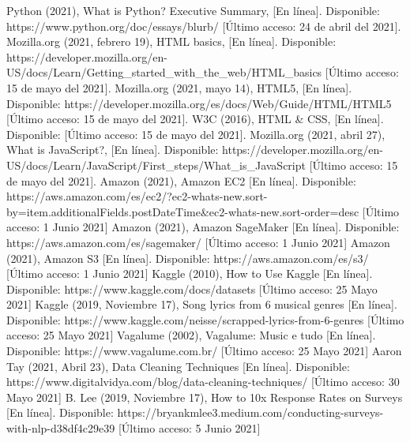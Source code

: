 \documentclass[12pt, a4paper, titlepage]{article}
\begin{document}
	\begin{thebibliography}{20}
		Python (2021), What is Python? Executive Summary, [En línea]. Disponible: https://www.python.org/doc/essays/blurb/ [Último acceso: 24 de abril del 2021].
		Mozilla.org (2021, febrero 19), HTML basics, [En línea]. Disponible: https://developer.mozilla.org/en-US/docs/Learn/Getting\_started\_with\_the\_web/HTML\_basics [Último acceso: 15 de mayo del 2021].
		Mozilla.org (2021, mayo 14), HTML5, [En línea]. Disponible: https://developer.mozilla.org/es/docs/Web/Guide/HTML/HTML5 [Último acceso: 15 de mayo del 2021].
		W3C (2016), HTML \& CSS, [En línea]. Disponible: [Último acceso: 15 de mayo del 2021].		
		Mozilla.org (2021, abril 27), What is JavaScript?, [En línea]. Disponible: https://developer.mozilla.org/en-US/docs/Learn/JavaScript/First\_steps/What\_is\_JavaScript [Último acceso: 15 de mayo del 2021].
		Amazon (2021), Amazon EC2 [En línea]. Disponible: https://aws.amazon.com/es/ec2/?ec2-whats-new.sort-by=item.additionalFields.postDateTime\&ec2-whats-new.sort-order=desc [Último acceso: 1 Junio 2021]		
		Amazon (2021), Amazon SageMaker [En línea]. Disponible: https://aws.amazon.com/es/sagemaker/ [Último acceso: 1 Junio 2021]		
		Amazon (2021), Amazon S3 [En línea]. Disponible: https://aws.amazon.com/es/s3/ [Último acceso: 1 Junio 2021]		
		Kaggle (2010), How to Use Kaggle [En línea]. Disponible: https://www.kaggle.com/docs/datasets [Último acceso: 25 Mayo 2021]
		Kaggle (2019, Noviembre 17), Song lyrics from 6 musical genres [En línea]. Disponible: https://www.kaggle.com/neisse/scrapped-lyrics-from-6-genres [Último acceso: 25 Mayo 2021]
		Vagalume (2002), Vagalume: Music e tudo [En línea]. Disponible: https://www.vagalume.com.br/ [Último acceso: 25 Mayo 2021]		
		Aaron Tay (2021, Abril 23), Data Cleaning Techniques [En línea]. Disponible: https://www.digitalvidya.com/blog/data-cleaning-techniques/ [Último acceso: 30 Mayo 2021]
		B. Lee (2019, Noviembre 17), How to 10x Response Rates on Surveys [En línea]. Disponible: https://bryankmlee3.medium.com/conducting-surveys-with-nlp-d38df4c29e39 [Último acceso: 5 Junio 2021]
		
	\end{thebibliography}	
\end{document}
